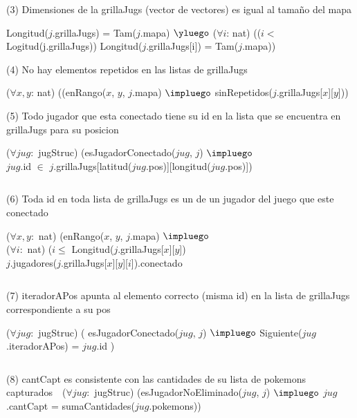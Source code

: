 \begin{Representacion}
(3) Dimensiones de la grillaJugs (vector de vectores) es igual al tama\~no del mapa $ $\newline

Longitud($j$.grillaJugs) = Tam($j$.mapa) $\yluego$ 
($\forall i$: nat) (($i <$ Logitud(j.grillaJugs)) Longitud($j$.grillaJugs[i]) = Tam($j$.mapa)) 
$ $\newline


(4) No hay elementos repetidos en las listas de grillaJugs  $ $\newline

($\forall x, y$: nat) ((enRango($x$, $y$, $j$.mapa) $\impluego$ sinRepetidos($j$.grillaJugs[$x$][$y$]))
$ $\newline

(5) Todo jugador que esta conectado tiene su id en la lista que se encuentra en grillaJugs para su posicion  $ $\newline


($\forall jug:$ jugStruc) (esJugadorConectado($jug$, $j$) $\impluego$ \\
	$jug$.id $\in$ $j$.grillaJugs[latitud($jug$.pos)][longitud($jug$.pos)])
	
$ $\newline

(6) Toda id en toda lista de grillaJugs es un de un jugador del juego que este conectado  $ $\newline

($\forall x, y:$ nat) (enRango($x$, $y$, $j$.mapa) $\impluego$ \\
	($\forall i:$ nat) ($i \leq$ Longitud($j$.grillaJugs[$x$][$y$]) \\
		$j$.jugadores($j$.grillaJugs[$x$][$y$][$i$]).conectado

$ $\newline

(7) iteradorAPos apunta al elemento correcto (misma id) en la lista de grillaJugs correspondiente a su pos $ $\newline

($\forall jug:$ jugStruc) ( esJugadorConectado($jug$, $j$) $\impluego$ Siguiente($jug$.iteradorAPos) = $jug$.id )

$ $\newline

(8) cantCapt es consistente con las cantidades de su lista de pokemons capturados $ $\newline
$ $\newline
($\forall jug:$ jugStruc) (esJugadorNoEliminado($jug$, $j$) $\impluego$ $jug$.cantCapt = sumaCantidades($jug$.pokemons))
$ $\newline



\end{Representacion}

